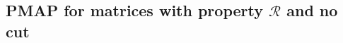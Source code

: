 \documentclass[11pt,letterpaper]{article}
\newcommand{\comp}[1]{\overline{#1}}
\newcommand{\sgc}[1]{\textcolor{orange}{\guillemotleft \textbf{Sumanta:} #1\guillemotright}}
\newcommand{\F}{\mathbb{F}}
\newtheorem{proposition}{Proposition}[section]
\newcommand{\prop}{\mathcal{R}}
\renewcommand{\vec}[1]{\mathbf{#1}}
\newcommand{\PMoracle}[1]{\textsc{PM}_{#1}}
\newcommand{\polyPMoracle}[1]{\textsc{polynomial-PM}_{#1}}
\begin{document}
{{{%


\subsection{PMAP for matrices with property $\prop$ and no cut}
\label{subsec:reconstruction-with-no-cut-&-Q}

}}}
\end{document}
